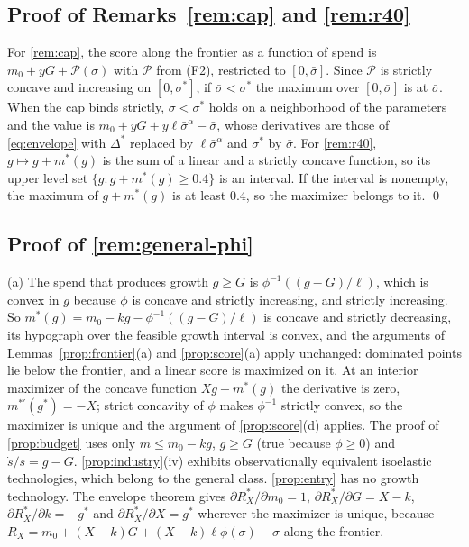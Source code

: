 \subsection*{Proof of Remarks~\ref{rem:cap} and \ref{rem:r40}}

For \autoref{rem:cap}, the score along the frontier as a function of spend is $m_0+yG+\mathcal P(\sigma)$ with $\mathcal P$ from (F2), restricted to $[0,\bar\sigma]$. Since $\mathcal P$ is strictly concave and increasing on $[0,\sigma^*]$, if $\bar\sigma<\sigma^*$ the maximum over $[0,\bar\sigma]$ is at $\bar\sigma$. When the cap binds strictly, $\bar\sigma<\sigma^*$ holds on a neighborhood of the parameters and the value is $m_0+yG+y\ell\bar\sigma^{\alpha}-\bar\sigma$, whose derivatives are those of \eqref{eq:envelope} with $\Delta^*$ replaced by $\ell\bar\sigma^{\alpha}$ and $\sigma^*$ by $\bar\sigma$. For \autoref{rem:r40}, $g\mapsto g+m^*(g)$ is the sum of a linear and a strictly concave function, so its upper level set $\{g:g+m^*(g)\ge 0.4\}$ is an interval. If the interval is nonempty, the maximum of $g+m^*(g)$ is at least $0.4$, so the maximizer belongs to it. \qed

\subsection*{Proof of \autoref{rem:general-phi}}

(a) The spend that produces growth $g\ge G$ is $\phi^{-1}((g-G)/\ell)$, which is convex in $g$ because $\phi$ is concave and strictly increasing, and strictly increasing. So $m^*(g)=m_0-kg-\phi^{-1}((g-G)/\ell)$ is concave and strictly decreasing, its hypograph over the feasible growth interval is convex, and the arguments of Lemmas~\ref{prop:frontier}(a) and \ref{prop:score}(a) apply unchanged: dominated points lie below the frontier, and a linear score is maximized on it. At an interior maximizer of the concave function $Xg+m^*(g)$ the derivative is zero, $m^{*\prime}(g^*)=-X$; strict concavity of $\phi$ makes $\phi^{-1}$ strictly convex, so the maximizer is unique and the argument of \autoref{prop:score}(d) applies. The proof of \autoref{prop:budget} uses only $m\le m_0-kg$, $g\ge G$ (true because $\phi\ge0$) and $\dot s/s=g-G$. \autoref{prop:industry}(iv) exhibits observationally equivalent isoelastic technologies, which belong to the general class. \autoref{prop:entry} has no growth technology. The envelope theorem gives $\partial R_X^*/\partial m_0=1$, $\partial R_X^*/\partial G=X-k$, $\partial R_X^*/\partial k=-g^*$ and $\partial R_X^*/\partial X=g^*$ wherever the maximizer is unique, because $R_X=m_0+(X-k)G+(X-k)\ell\phi(\sigma)-\sigma$ along the frontier.


